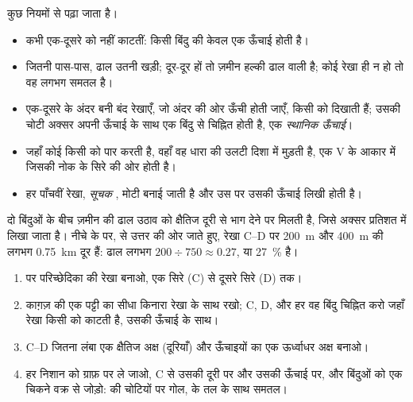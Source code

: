  कुछ नियमों से पढ़ा जाता है।
\begin{itemize}
  \item {} कभी एक-दूसरे को नहीं काटतीं: किसी बिंदु की केवल एक ऊँचाई होती है।
  \item {} जितनी पास-पास, ढाल उतनी खड़ी; दूर-दूर हों तो ज़मीन हल्की ढाल वाली है;
        कोई रेखा ही न हो तो वह लगभग समतल है।
  \item एक-दूसरे के अंदर बनी बंद रेखाएँ, जो अंदर की ओर ऊँची होती जाएँ, किसी  को
        दिखाती हैं; उसकी चोटी अक्सर अपनी ऊँचाई के साथ एक बिंदु से चिह्नित होती है, एक
        \emph{स्थानिक ऊँचाई}।
  \item जहाँ कोई  किसी  को पार करती है, वहाँ वह धारा की उलटी दिशा में मुड़ती
        है, एक V के आकार में जिसकी नोक  के सिरे की ओर होती है।
  \item हर पाँचवीं रेखा, \emph{सूचक }, मोटी बनाई जाती है और उस पर उसकी
        ऊँचाई लिखी होती है।
\end{itemize}

दो बिंदुओं के बीच ज़मीन की ढाल उठाव को क्षैतिज दूरी से भाग देने पर मिलती है, जिसे अक्सर
प्रतिशत में लिखा जाता है। नीचे के  पर,  से उत्तर की ओर जाते हुए, रेखा C--D पर
\qty{200}{m} और \qty{400}{m} की  लगभग \qty{0.75}{km} दूर हैं: ढाल लगभग
$200 \div 750
\approx 0.27$, या \qty{27}{\%}
है।

\begin{method}[स्थलाकृतिक परिच्छेदिका बनाना]
\begin{enumerate}
  \item {} पर परिच्छेदिका की रेखा बनाओ, एक सिरे (C) से दूसरे सिरे
        (D) तक।
  \item काग़ज़ की एक पट्टी का सीधा किनारा रेखा के साथ रखो; C, D, और हर वह बिंदु चिह्नित
        करो जहाँ रेखा किसी  को काटती है, उसकी ऊँचाई के
        साथ।
  \item C--D जितना लंबा एक क्षैतिज अक्ष (दूरियाँ) और ऊँचाइयों का एक ऊर्ध्वाधर अक्ष
        बनाओ।
  \item हर निशान को ग्राफ़ पर ले जाओ, C से उसकी दूरी पर और उसकी ऊँचाई पर, और बिंदुओं
        को एक चिकने वक्र से जोड़ो:  की चोटियों पर गोल,  के तल के साथ
        समतल।
\end{enumerate}
\end{method}


